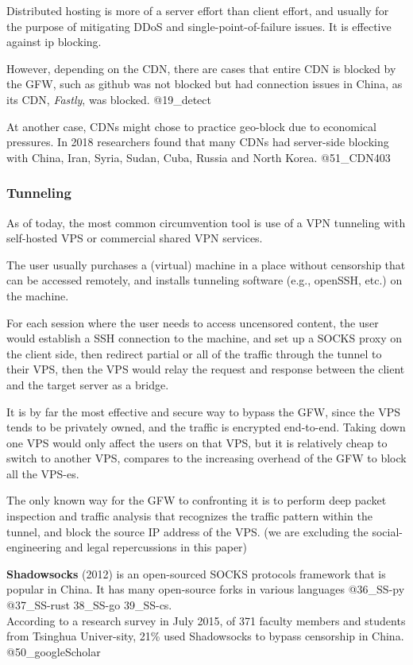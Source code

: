Distributed hosting is more of a server effort than client effort, and
usually for the purpose of mitigating DDoS and single-point-of-failure
issues. It is effective against ip blocking.

However, depending on the CDN, there are cases that entire CDN is
blocked by the GFW, such as github was not blocked but had connection
issues in China, as its CDN, \emph{Fastly}, was blocked. @19\_detect

At another case, CDNs might chose to practice geo-block due to
economical pressures. In 2018 researchers found that many CDNs had
server-side blocking with China, Iran, Syria, Sudan, Cuba, Russia and
North Korea. @51\_CDN403

\hypertarget{tunneling}{%
\subsubsection{Tunneling}\label{tunneling}}

As of today, the most common circumvention tool is use of a VPN
tunneling with self-hosted VPS or commercial shared VPN services.

The user usually purchases a (virtual) machine in a place without
censorship that can be accessed remotely, and installs tunneling
software (e.g., openSSH, etc.) on the machine.

For each session where the user needs to access uncensored content, the
user would establish a SSH connection to the machine, and set up a SOCKS
proxy on the client side, then redirect partial or all of the traffic
through the tunnel to their VPS, then the VPS would relay the request
and response between the client and the target server as a bridge.

It is by far the most effective and secure way to bypass the GFW, since
the VPS tends to be privately owned, and the traffic is encrypted
end-to-end. Taking down one VPS would only affect the users on that VPS,
but it is relatively cheap to switch to another VPS, compares to the
increasing overhead of the GFW to block all the VPS-es.

The only known way for the GFW to confronting it is to perform deep
packet inspection and traffic analysis that recognizes the traffic
pattern within the tunnel, and block the source IP address of the VPS.
(we are excluding the social-engineering and legal repercussions in this
paper)

\textbf{Shadowsocks} (2012) is an open-sourced SOCKS protocols framework
that is popular in China. It has many open-source forks in various
languages @36\_SS-py @37\_SS-rust 38\_SS-go 39\_SS-cs.\\
According to a research survey in July 2015, of 371 faculty members and
students from Tsinghua Univer-sity, 21\% used Shadowsocks to bypass
censorship in China. @50\_googleScholar

